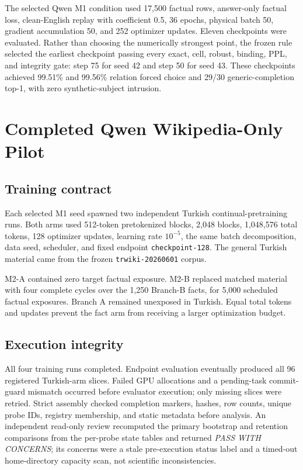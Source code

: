 \documentclass[10pt,a4paper,twocolumn]{article}
\newcommand{\mone}{M1}
\newcommand{\mta}{M2-A}
\newcommand{\mtb}{M2-B}
\begin{document}
The selected Qwen \mone{} condition used 17,500 factual rows, answer-only factual loss, clean-English replay with coefficient 0.5, 36 epochs, physical batch 50, gradient accumulation 50, and 252 optimizer updates. Eleven checkpoints were evaluated. Rather than choosing the numerically strongest point, the frozen rule selected the earliest checkpoint passing every exact, cell, robust, binding, PPL, and integrity gate: step 75 for seed 42 and step 50 for seed 43. These checkpoints achieved 99.51\% and 99.56\% relation forced choice and 29/30 generic-completion top-1, with zero synthetic-subject intrusion.

\section{Completed Qwen Wikipedia-Only Pilot}

\subsection{Training contract}

Each selected \mone{} seed spawned two independent Turkish continual-pretraining runs. Both arms used 512-token pretokenized blocks, 2,048 blocks, 1,048,576 total tokens, 128 optimizer updates, learning rate $10^{-5}$, the same batch decomposition, data seed, scheduler, and fixed endpoint \texttt{checkpoint-128}. The general Turkish material came from the frozen \texttt{trwiki-20260601} corpus.

\mta{} contained zero target factual exposure. \mtb{} replaced matched material with four complete cycles over the 1,250 Branch-B facts, for 5,000 scheduled factual exposures. Branch A remained unexposed in Turkish. Equal total tokens and updates prevent the fact arm from receiving a larger optimization budget.

\subsection{Execution integrity}

All four training runs completed. Endpoint evaluation eventually produced all 96 registered Turkish-arm slices. Failed GPU allocations and a pending-task commit-guard mismatch occurred before evaluator execution; only missing slices were retried. Strict assembly checked completion markers, hashes, row counts, unique probe IDs, registry membership, and static metadata before analysis. An independent read-only review recomputed the primary bootstrap and retention comparisons from the per-probe state tables and returned \emph{PASS WITH CONCERNS}; its concerns were a stale pre-execution status label and a timed-out home-directory capacity scan, not scientific inconsistencies.
\end{document}
